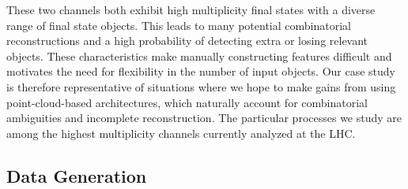 \documentclass[aps,prd,twocolumn,superscriptaddress,floatfix,longbibliography,preprintnumbers,nofootinbib]{revtex4-1} %
\newcommand{\neww}[1]{{{#1}}}
\begin{document}
\neww{These two channels both exhibit high multiplicity final states with a diverse range of final state objects. This leads to many potential combinatorial reconstructions and a high probability of detecting extra or losing relevant objects. These characteristics make manually constructing features difficult and motivates the need for flexibility in the number of input objects. Our case study is therefore representative of situations where we hope to make gains from using point-cloud-based architectures, which naturally account for combinatorial ambiguities and incomplete reconstruction.  The particular processes we study are among the highest multiplicity channels currently analyzed at the LHC.}


\subsection{Data Generation}
\label{sec:data}
\end{document}
